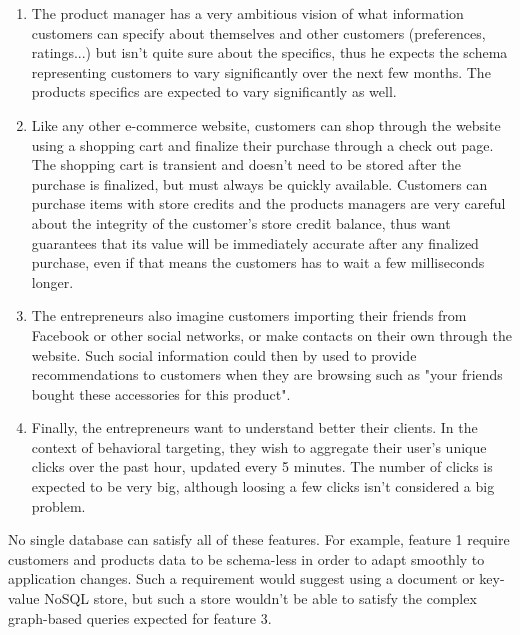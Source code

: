 \begin{enumerate}[label=(\alph*)]
\item{The product manager has a very ambitious vision of what information customers can specify about themselves and other customers (preferences, ratings...) but isn't quite sure about the specifics, thus he expects the schema representing customers to vary significantly over the next few months. The products specifics are expected to vary significantly as well.}
\item{Like any other e-commerce website, customers can shop through the website using a shopping cart and finalize their purchase through a check out page. The shopping cart is transient and doesn't need to be stored after the purchase is finalized, but must always be quickly available. Customers can purchase items with store credits and the products managers are very careful about the integrity of the customer's store credit balance, thus want guarantees that its value will be immediately accurate after any finalized purchase, even if that means the customers has to wait a few milliseconds longer.}
\item{The entrepreneurs also imagine customers importing their friends from Facebook or other social networks, or make contacts on their own through the website. Such social information could then by used to provide recommendations to customers when they are browsing such as "your friends bought these accessories for this product".}
\item{Finally, the entrepreneurs want to understand better their clients. In the context of behavioral targeting, they wish to aggregate their user's unique clicks over the past hour, updated every 5 minutes. The number of clicks is expected to be very big, although loosing a few clicks isn't considered a big problem.}
\end{enumerate}


No single database can satisfy all of these features. For example, feature 1 require customers and products data to be schema-less in order to adapt smoothly to application changes. Such a requirement would suggest using a document or key-value NoSQL store, but such a store wouldn't be able to satisfy the complex graph-based queries expected for feature 3.

